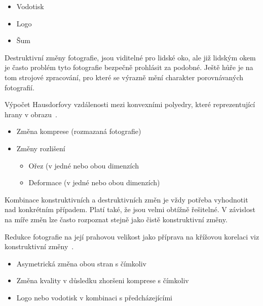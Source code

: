\begin{itemize}
	\setlength{\parskip}{0pt}
	\setlength{\itemsep}{0pt}
	\item{Vodotisk}
	\item{Logo}
	\item{Šum}
\end{itemize}

Destruktivní změny fotografie, jsou viditelné pro lidské oko, ale již lidským okem je často problém tyto fotografie bezpečně prohlásit za podobné. Ještě hůře je na tom strojové zpracování, pro které se výrazně mění charakter porovnávaných fotografií.

Výpočet Hausdorfovy vzdálenosti mezi konvexními polyedry, které reprezentující hrany v obrazu~\cite{FFT-technique}.

\begin{itemize}
	\setlength{\parskip}{0pt}
	\setlength{\itemsep}{0pt}
	\item{Změna komprese (rozmazaná fotografie)}
	\item{Změny rozlišení}
	\begin{itemize}
		\item{Ořez (v jedné nebo obou dimenzích}
		\item{Deformace (v jedné nebo obou dimenzích)}
	\end{itemize}
\end{itemize}

Kombinace konstruktivních a destruktivních změn je vždy potřeba vyhodnotit nad konkrétním případem. Platí také, že jsou velmi obtížně řešitelné. V závislost na míře změn lze často rozpoznat stejně jako čistě konstruktivní změny.

Redukce fotografie na její prahovou velikost jako příprava na křížovou korelaci viz konstruktivní změny~\cite{fftw3}.

\begin{itemize}
	\setlength{\parskip}{0pt}
	\setlength{\itemsep}{0pt}
	\item {Asymetrická změna obou stran s čímkoliv}
	\item {Změna kvality v důsledku zhoršeni komprese s čímkoliv}
	\item {Logo nebo vodotisk v kombinaci s předcházejícími}
\end{itemize}

